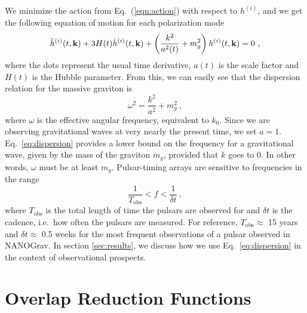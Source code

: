 \documentclass[prd,aps,psfig,nofootinbib,nobibnotes,superscriptaddress,preprintnumbers,times]{revtex4-2}\setlength{\topmargin}{-14mm}
\begin{document}
We minimize the action from Eq.\ (\ref{eqn:action}) with respect to $h^{(i)}$, and we get the following equation of motion for each polarization mode \cite{Maggiore:v2} 
\begin{equation}\label{eqn:eom}
    \ddot{h}^{(i)}(t, {\bf k}) + 3 H(t)\dot{h}^{(i)}(t, {\bf k}) + \left(\frac{k^2}{a^2(t)} + m_g^2\right)h^{(i)}(t, {\bf k}) = 0 \ ,
\end{equation}
where the dots represent the usual time derivative, $a(t)$ is the scale factor and $H(t)$ is the Hubble parameter. From this, we can easily see that the dispersion relation for the massive graviton is 
\begin{equation}\label{eq:dispersion}
    \omega^2 = \frac{k^2}{a^2} + m_g^2 \ ,
\end{equation}
where $\omega$ is the effective angular frequency, equivalent to $k_0$. Since we are observing gravitational waves at very nearly the present time, we set $a = 1$. Eq.\ \ref{eq:dispersion} provides a lower bound on the frequency for a gravitational wave, given by the mass of the graviton $m_g$, provided that $k$ goes to 0. In other words, $\omega$ must be at least $m_g$. Pulsar-timing arrays are sensitive to frequencies in the range \cite{Moore:2014lga}
\begin{equation}\label{eq:freqrange}
    \frac{1}{T_{\text{obs}}} < f < \frac{1}{\delta t} \ ,
\end{equation} where $T_{\text{obs}}$ is the total length of time the pulsars are observed for and $\delta t$ is the cadence, i.e.\ how often the pulsars are measured. For reference, $T_{\text{obs}} \approx$ 15 years and $\delta t \approx$ 0.5 weeks for the most frequent observations of a pulsar observed in NANOGrav. In section \ref{sec:results}, we discuss how we use Eq.\ \ref{eq:dispersion} in the context of observational prospects. 

\section{Overlap Reduction Functions}\label{sec:overlap}
\end{document}
